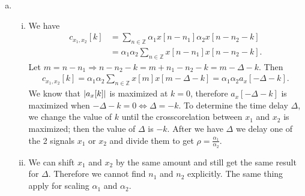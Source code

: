 \begin{enumerate}[(a)]
\begin{enumerate}[i.]
	\item 
\end{enumerate}

\item 
\begin{enumerate}[i.]
	\item We have
	\begin{align*}
	c_{x_1, x_2}[k]
	&= \sum_{n \in \mathbb{Z}} \alpha_1 x[n - n_1] \alpha_2 x[n - n_2 - k] \\
	&= \alpha_1 \alpha_2 \sum_{n \in \mathbb{Z}} x[n - n_1] x[n - n_2 - k].
	\end{align*}
	Let $m = n - n_1 \Rightarrow n - n_2 - k = m + n_1 - n_2 - k = m - \Delta - k$. Then
	\begin{align*}
	c_{x_1, x_2}[k] = \alpha_1 \alpha_2 \sum_{n \in \mathbb{Z}} x[m] x[m - \Delta - k] = \alpha_1 \alpha_2 a_x[-\Delta - k].
	\end{align*}
	We know that $\left\lvert a_x[k] \right\rvert$ is maximized at $k = 0$, therefore $a_x[-\Delta -k]$ is maximized when $-\Delta - k = 0 \Leftrightarrow \Delta = - k$. To determine the time delay $\Delta$, we change the value of $k$ until the crosscorelation between $x_1$ and $x_2$ is maximized; then the value of $\Delta$ is $-k$. After we have $\Delta$ we delay one of the 2 signals $x_1$ or $x_2$ and divide them to get $\rho = \frac{\alpha_1}{\alpha_2}$.
	
	\item We can shift $x_1$ and $x_2$ by the same amount and still get the same result for $\Delta$. Therefore we cannot find $n_1$ and $n_2$ explicitly. The same thing apply for scaling $\alpha_1$ and $\alpha_2$.
\end{enumerate}
\end{enumerate}